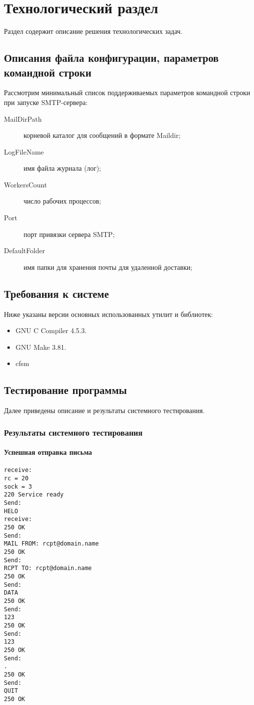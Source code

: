 \chapter{Технологический раздел}

Раздел содержит описание решения технологических задач.

\section{Описания файла конфигурации, параметров командной строки}
Рассмотрим минимальный список поддерживаемых параметров командной строки при запуске SMTP-сервера:

\begin{description}

\item[MailDirPath] корневой каталог для сообщений в формате Maildir;
\item[LogFileName] имя файла журнала (лог);
\item[WorkersCount] число рабочих процессов;
\item[Port] порт привязки сервера SMTP;
\item[DefaultFolder] имя папки для хранения почты для удаленной доставки;
\end{description}

\section{Требования к системе}

Ниже указаны версии основных использованных утилит и библиотек:
\begin{itemize}
\item GNU C Compiler 4.5.3.
\item GNU Make 3.81.
\item cfsm 
\end{itemize}

\section{Тестирование программы}
Далее приведены описание и результаты  системного тестирования.

\subsection{Результаты системного тестирования}

\subsubsection{Успешная отправка письма}

\begin{verbatim}
receive: 
rc = 20
sock = 3
220 Service ready
Send: 
HELO
receive: 
250 OK
Send: 
MAIL FROM: rcpt@domain.name
250 OK
Send: 
RCPT TO: rcpt@domain.name
250 OK
Send: 
DATA
250 OK
Send: 
123
250 OK
Send: 
123
250 OK
Send: 
.
250 OK
Send: 
QUIT
250 OK
\end{verbatim}



